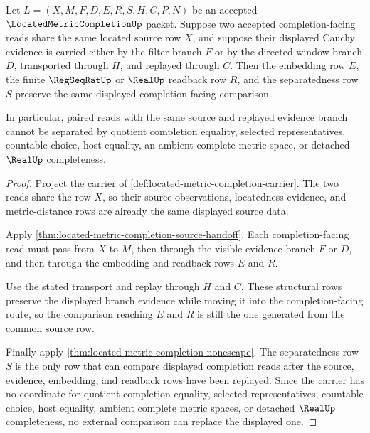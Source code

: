\begin{theorem}
\label{thm:located-metric-completion-modulus-pair-stability}
Let $L=(X,M,F,D,E,R,S,H,C,P,N)$ be an accepted $\LocatedMetricCompletionUp$ packet. Suppose two accepted completion-facing reads share the same located source row $X$, and suppose their displayed Cauchy evidence is carried either by the filter branch $F$ or by the directed-window branch $D$, transported through $H$, and replayed through $C$. Then the embedding row $E$, the finite $\RegSeqRatUp$ or $\RealUp$ readback row $R$, and the separatedness row $S$ preserve the same displayed completion-facing comparison.

In particular, paired reads with the same source and replayed evidence branch cannot be separated by quotient completion equality, selected representatives, countable choice, host equality, an ambient complete metric space, or detached $\RealUp$ completeness.
\end{theorem}
\begin{proof}
Project the carrier of \autoref{def:located-metric-completion-carrier}. The two reads share the row $X$, so their source observations, locatedness evidence, and metric-distance rows are already the same displayed source data.

Apply \autoref{thm:located-metric-completion-source-handoff}. Each completion-facing read must pass from $X$ to $M$, then through the visible evidence branch $F$ or $D$, and then through the embedding and readback rows $E$ and $R$.

Use the stated transport and replay through $H$ and $C$. These structural rows preserve the displayed branch evidence while moving it into the completion-facing route, so the comparison reaching $E$ and $R$ is still the one generated from the common source row.

Finally apply \autoref{thm:located-metric-completion-nonescape}. The separatedness row $S$ is the only row that can compare displayed completion reads after the source, evidence, embedding, and readback rows have been replayed. Since the carrier has no coordinate for quotient completion equality, selected representatives, countable choice, host equality, ambient complete metric spaces, or detached $\RealUp$ completeness, no external comparison can replace the displayed one.
\end{proof}



